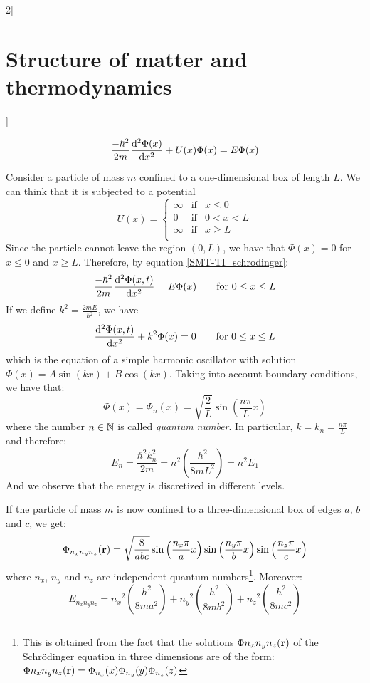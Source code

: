 \documentclass[../../../main.tex]{subfiles}
\begin{document}
\begin{multicols}{2}[\section{Structure of matter and thermodynamics}]
\begin{definition}
\begin{equation}
            \frac{-\hbar^2}{2m}\dv[2]{\Phi(x)}{x}+U(x)\Phi(x)=E\Phi(x)
        \end{equation}
    \end{definition}
    \begin{prop}
        Consider a particle of mass $m$ confined to a one-dimensional box of length $L$. We can think that it is subjected to a potential $$U(x)=\left\{
            \begin{array}{lll}
                \infty & \text{if} & x\leq 0   \\
                0      & \text{if} & 0 < x < L \\
                \infty & \text{if} & x\geq L   \\
            \end{array}
            \right.$$
        Since the particle cannot leave the region $(0,L)$, we have that $\Phi(x)=0$ for $x\leq 0$ and $x\geq L$. Therefore, by equation \eqref{SMT-TI_schrodinger}:
        $$
            \frac{-\hbar^2}{2m}\dv[2]{\Phi(x,t)}{x}=E\Phi(x)\qquad\text{for }0\leq x\leq L
        $$
        If we define $k^2=\frac{2m E}{\hbar^2}$, we have
        $$
            \dv[2]{\Phi(x,t)}{x}+k^2\Phi(x)=0\qquad\text{for }0\leq x\leq L
        $$
        which is the equation of a simple harmonic oscillator with solution $\Phi(x)=A\sin(kx)+B\cos(kx)$. Taking into account boundary conditions, we have that: $$\Phi(x)=\Phi_n(x)=\sqrt{\frac{2}{L}}\sin\left(\frac{n\pi}{L}x\right)$$ where the number $n\in\mathbb{N}$ is called \textit{quantum number}. In particular, $k=k_n=\frac{n\pi}{L}$ and therefore: $$E_n=\frac{\hbar^2k_n^2}{2m}=n^2\left(\frac{h^2}{8mL^2}\right)=n^2E_1$$ And we observe that the energy is discretized in different levels.
    \end{prop}
    \begin{prop}
        If the particle of mass $m$ is now confined to a three-dimensional box of edges $a$, $b$ and $c$, we get:
        $$\Phi_{n_xn_yn_z}(\boldsymbol{\mathrm{r}})=\sqrt{\frac{8}{abc}}\sin\left(\frac{n_x\pi}{a}x\right)\sin\left(\frac{n_y\pi}{b}x\right)\sin\left(\frac{n_z\pi}{c}x\right)$$
        where $n_x$, $n_y$ and $n_z$ are independent quantum numbers\footnote{This is obtained from the fact that the solutions $\Phi{n_xn_yn_z}(\boldsymbol{\mathrm{r}})$ of the Schrödinger equation in three dimensions are of the form: $\Phi{n_xn_yn_z}(\boldsymbol{\mathrm{r}})=\Phi_{n_x}(x)\Phi_{n_y}(y)\Phi_{n_z}(z)$}. Moreover:
        $$E_{n_xn_yn_z}={n_x}^2\left(\frac{h^2}{8ma^2}\right)+{n_y}^2\left(\frac{h^2}{8mb^2}\right)+{n_z}^2\left(\frac{h^2}{8mc^2}\right)$$

\end{prop}
\end{multicols}
\end{document}
